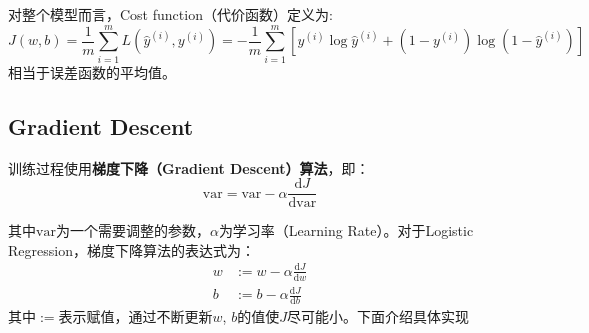 对整个模型而言，Cost function（代价函数）定义为:
\begin{equation}
	J(w, b) = \frac{1}{m} \sum_{i=1}^{m} L(\hat{y}^{(i)}, y^{(i)}) = -\frac{1}{m} \sum_{i=1}^{m} \left[y^{(i)} \log \hat{y}^{(i)} + (1 - y^{(i)}) \log (1 - \hat{y}^{(i)})\right] \label{eq:cost}
\end{equation}
相当于误差函数的平均值。

\subsection{Gradient Descent}

训练过程使用\textbf{梯度下降（Gradient Descent）算法}，即：
\begin{equation}
	\mathrm{var} = \mathrm{var} - \alpha \frac{\mathrm{d}J}{\mathrm{d}\mathrm{var}} \label{eq:gradient}
\end{equation}

其中$\mathrm{var}$为一个需要调整的参数，$\alpha$为学习率（Learning Rate）。对于Logistic Regression，梯度下降算法的表达式为：
\begin{equation}
	\begin{aligned}
	w &:= w - \alpha \frac{\mathrm{d}J}{\mathrm{d}w} \\
	b &:= b - \alpha \frac{\mathrm{d}J}{\mathrm{d}b}
	\end{aligned} 
	\label{eq:gradient_logistic}
\end{equation}
其中$:=$表示赋值，通过不断更新$w$, $b$的值使$J$尽可能小。下面介绍具体实现

